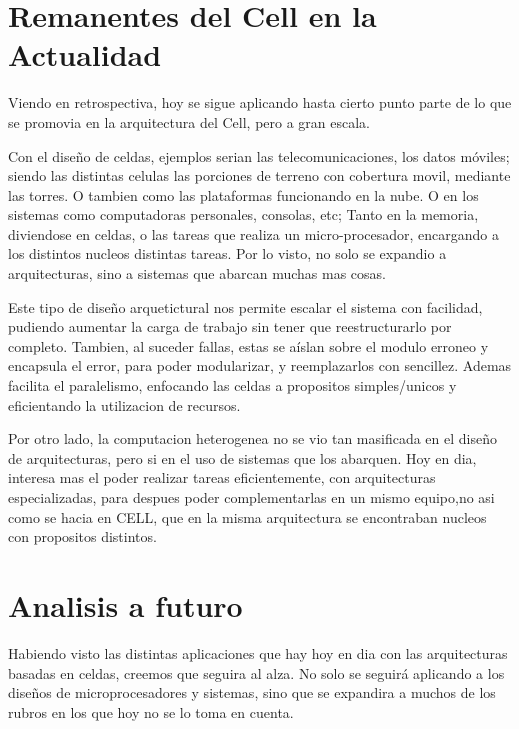 \documentclass[10pt,compsoc]{IEEEtran}
\begin{document}
	
	\section{Remanentes del Cell en la Actualidad}%
	\noindent Viendo en retrospectiva, hoy se sigue aplicando hasta cierto punto parte de lo que se promovia en la arquitectura del Cell, pero a gran escala. \newline
	
	Con el diseño de celdas, ejemplos serian las telecomunicaciones, los datos móviles; siendo las distintas celulas las porciones de terreno con cobertura movil, mediante las torres. O tambien como las plataformas funcionando en la nube.	O en los sistemas como computadoras personales, consolas, etc; Tanto en la memoria, diviendose en celdas, o las tareas que realiza un micro-procesador, encargando a los distintos nucleos distintas tareas. Por lo visto, no solo se expandio a arquitecturas, sino a sistemas que abarcan muchas mas cosas.\newline
	
	Este tipo de diseño arquetictural nos permite escalar el sistema con facilidad, pudiendo aumentar la carga de trabajo sin tener que reestructurarlo por completo. Tambien, al suceder fallas, estas se aíslan sobre el modulo erroneo y encapsula el error, para poder modularizar, y reemplazarlos con sencillez. Ademas facilita el paralelismo, enfocando las celdas a propositos simples/unicos y eficientando la utilizacion de recursos.\newline
	
	
	Por otro lado, la computacion heterogenea no se vio tan masificada en el diseño de arquitecturas, pero si en el uso de sistemas que los abarquen. Hoy en dia, interesa mas el poder realizar tareas eficientemente, con arquitecturas especializadas, para despues poder complementarlas en un mismo equipo,no asi como se hacia en CELL, que en la misma arquitectura se encontraban nucleos con propositos distintos. 
		
	\section{Analisis a futuro}
	\noindent Habiendo visto las distintas aplicaciones que hay hoy en dia con las arquitecturas basadas en celdas, creemos que seguira al alza. No solo se seguirá aplicando a los diseños de microprocesadores y sistemas, sino que se expandira a muchos de los rubros en los que hoy no se lo toma en cuenta. \newline
	
\end{document}
